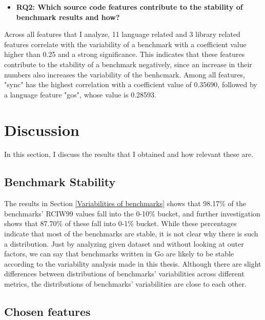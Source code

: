 \documentclass{seal_thesis}
\begin{document}
\begin{itemize}
	\item \textbf{RQ2: Which source code features contribute to the stability of benchmark results and how?}
\end{itemize}

\noindent Across all features that I analyze, 11 language related and 3 library related features correlate with the variability of a benchmark with a coefficient value higher than 0.25 and a strong significance. This indicates that these features contribute to the stability of a benchmark negatively, since an increase in their numbers also increases the variability of the benhcmark. Among all features, "sync" has the highest correlation with a coefficient value of 0.35690, followed by a language feature "gos", whose value is 0.28593.

\chapter{Discussion}
\label{Discussion}
In this section, I discuss the results that I obtained and how relevant these are.

\section{Benchmark Stability}
\label{benchstabilitydiscuss}

The results in Section \ref{Variabilities of benchmarks} shows that 98.17\% of the benchmarks' RCIW99 values fall into the 0-10\% bucket, and further investigation shows that 87.70\% of these fall into 0-1\% bucket. While these percentages indicate that most of the benchmarks are stable, it is not clear why there is such a distribution. Just by analyzing given dataset and without looking at outer factors, we can say that benchmarks written in Go are likely to be stable according to the variability analysis made in this thesis. Although there are slight differences between distributions of benchmarks' variabilities across different metrics, the distributions of benchmarks' variabilities are close to each other.

\section{Chosen features}
\label{chosenfeatures}
\end{document}
